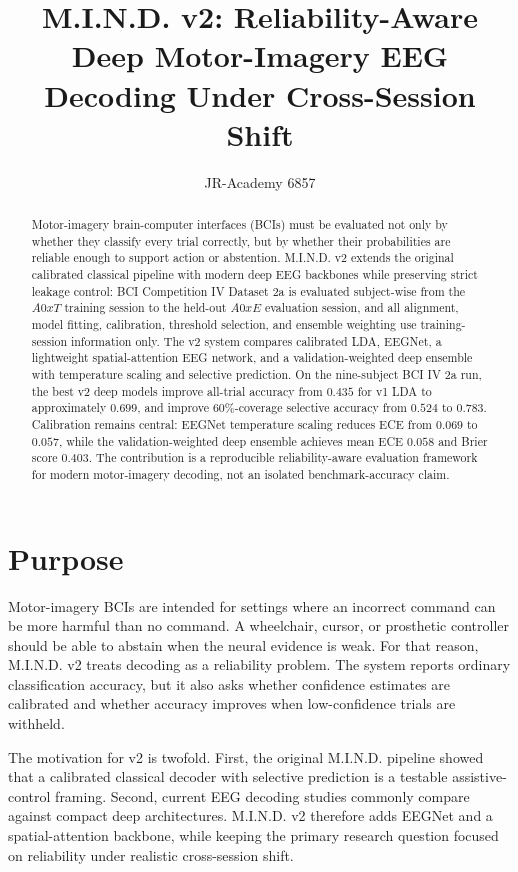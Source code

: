 \documentclass[11pt]{article}
\title{M.I.N.D. v2: Reliability-Aware Deep Motor-Imagery EEG Decoding Under Cross-Session Shift}
\author{JR-Academy 6857}
\date{}
\begin{document}
\maketitle

\begin{abstract}
Motor-imagery brain-computer interfaces (BCIs) must be evaluated not only by
whether they classify every trial correctly, but by whether their probabilities
are reliable enough to support action or abstention. M.I.N.D. v2 extends the
original calibrated classical pipeline with modern deep EEG backbones while
preserving strict leakage control: BCI Competition IV Dataset 2a is evaluated
subject-wise from the \(A0xT\) training session to the held-out \(A0xE\)
evaluation session, and all alignment, model fitting, calibration, threshold
selection, and ensemble weighting use training-session information only. The
v2 system compares calibrated LDA, EEGNet, a lightweight spatial-attention EEG
network, and a validation-weighted deep ensemble with temperature scaling and
selective prediction. On the nine-subject BCI IV 2a run, the best v2 deep
models improve all-trial accuracy from \(0.435\) for v1 LDA to approximately
\(0.699\), and improve 60\%-coverage selective accuracy from \(0.524\) to
\(0.783\). Calibration remains central: EEGNet temperature scaling reduces
ECE from \(0.069\) to \(0.057\), while the validation-weighted deep ensemble
achieves mean ECE \(0.058\) and Brier score \(0.403\). The contribution is a
reproducible reliability-aware evaluation framework for modern motor-imagery
decoding, not an isolated benchmark-accuracy claim.
\end{abstract}

\section{Purpose}

Motor-imagery BCIs are intended for settings where an incorrect command can be
more harmful than no command. A wheelchair, cursor, or prosthetic controller
should be able to abstain when the neural evidence is weak. For that reason,
M.I.N.D. v2 treats decoding as a reliability problem. The system reports
ordinary classification accuracy, but it also asks whether confidence estimates
are calibrated and whether accuracy improves when low-confidence trials are
withheld.

The motivation for v2 is twofold. First, the original M.I.N.D. pipeline showed
that a calibrated classical decoder with selective prediction is a testable
assistive-control framing. Second, current EEG decoding studies commonly
compare against compact deep architectures. M.I.N.D. v2 therefore adds EEGNet
and a spatial-attention backbone, while keeping the primary research question
focused on reliability under realistic cross-session shift.
\end{document}
